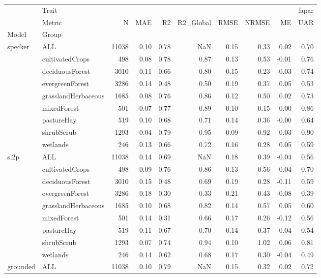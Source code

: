 \begin{tabular}{llrrrrrrrr}
\toprule
 & Trait & \multicolumn{8}{r}{fapar} \\
 & Metric & N & MAE & R2 & R2_Global & RMSE & NRMSE & ME & UAR \\
Model & Group &  &  &  &  &  &  &  &  \\
\midrule
\multirow[t]{9}{*}{specker} & ALL & 11038 & 0.10 & 0.78 & NaN & 0.15 & 0.33 & 0.02 & 0.70 \\
 & cultivatedCrops & 498 & 0.08 & 0.78 & 0.87 & 0.13 & 0.53 & -0.01 & 0.76 \\
 & deciduousForest & 3010 & 0.11 & 0.66 & 0.80 & 0.15 & 0.23 & -0.03 & 0.74 \\
 & evergreenForest & 3286 & 0.14 & 0.48 & 0.50 & 0.19 & 0.37 & 0.05 & 0.53 \\
 & grasslandHerbaceous & 1685 & 0.08 & 0.76 & 0.86 & 0.12 & 0.50 & 0.02 & 0.73 \\
 & mixedForest & 501 & 0.07 & 0.77 & 0.89 & 0.10 & 0.15 & 0.00 & 0.86 \\
 & pastureHay & 519 & 0.10 & 0.68 & 0.71 & 0.14 & 0.36 & -0.00 & 0.64 \\
 & shrubScrub & 1293 & 0.04 & 0.79 & 0.95 & 0.09 & 0.92 & 0.03 & 0.90 \\
 & wetlands & 246 & 0.13 & 0.66 & 0.72 & 0.16 & 0.28 & 0.05 & 0.59 \\
\cline{1-10}
\multirow[t]{9}{*}{sl2p} & ALL & 11038 & 0.14 & 0.69 & NaN & 0.18 & 0.39 & -0.04 & 0.56 \\
 & cultivatedCrops & 498 & 0.09 & 0.76 & 0.86 & 0.13 & 0.56 & 0.04 & 0.70 \\
 & deciduousForest & 3010 & 0.15 & 0.48 & 0.69 & 0.19 & 0.28 & -0.11 & 0.59 \\
 & evergreenForest & 3286 & 0.18 & 0.30 & 0.33 & 0.21 & 0.43 & -0.08 & 0.39 \\
 & grasslandHerbaceous & 1685 & 0.10 & 0.68 & 0.82 & 0.14 & 0.57 & 0.05 & 0.60 \\
 & mixedForest & 501 & 0.14 & 0.31 & 0.66 & 0.17 & 0.26 & -0.12 & 0.56 \\
 & pastureHay & 519 & 0.11 & 0.67 & 0.70 & 0.14 & 0.37 & 0.04 & 0.54 \\
 & shrubScrub & 1293 & 0.07 & 0.74 & 0.94 & 0.10 & 1.02 & 0.06 & 0.81 \\
 & wetlands & 246 & 0.14 & 0.62 & 0.68 & 0.17 & 0.30 & -0.04 & 0.49 \\
\cline{1-10}
\multirow[t]{9}{*}{grounded} & ALL & 11038 & 0.10 & 0.79 & NaN & 0.15 & 0.32 & 0.02 & 0.72 \\

\end{tabular}

